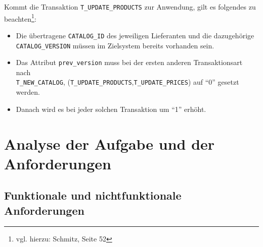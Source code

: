 	Kommt die Transaktion \texttt{T\_UPDATE\_PRODUCTS} zur Anwendung, gilt es folgendes zu beachten\footnote{vgl. hierzu: Schmitz, Seite 52}: 
	\begin{itemize}
		\item Die übertragene \texttt{CATALOG\_ID} des jeweiligen Lieferanten und die dazugehörige\\ \texttt{CATALOG\_VERSION} müssen im Zielsystem bereits vorhanden sein.
		\item Das Attribut \texttt{prev\_version} muss bei der ersten anderen Transaktionsart nach\\ \texttt{T\_NEW\_CATALOG}, (\texttt{T\_UPDATE\_PRODUCTS},\texttt{T\_UPDATE\_PRICES}) auf \enquote{0} gesetzt werden.
		\item Danach wird es bei jeder solchen Transaktion um \enquote{1} erhöht.
	\end{itemize}
	\clearpage	
	\section{Analyse der Aufgabe und der Anforderungen}
	
	\subsection{Funktionale und nichtfunktionale Anforderungen}	
		
